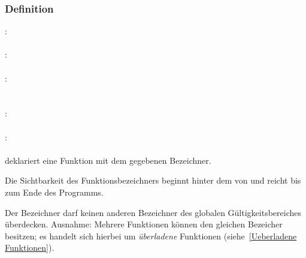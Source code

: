 \subsubsection{Definition}\label{Definition}
:\label{funktion_definition}\\
\hspace*{1cm} \Gspace\Gt{\{}\Gspace{} \Gspace\Gt{\}}\\
:\label{funktion_kopf}\\
\hspace*{1cm} \Gspace{}\Gspace\Gt{(}\Gspace{}\Gspace\Gt{)}\\
:\label{funktion_typ}\\
\hspace*{1cm} \\
\hspace*{1cm}\\
:\label{funktion_param_formal_liste}\\
\hspace*{1cm} \Gspace{}\\
:\label{funktion_param_formal}\\
\hspace*{1cm}\Gspace{}\Gspace{} \Gspace{}\Gspace{}\\

 deklariert eine Funktion mit dem gegebenen Bezeichner.

Die Sichtbarkeit des Funktionsbezeichners beginnt hinter dem \Gt{)} von 
und reicht bis zum Ende des Programms.

Der Bezeichner darf keinen anderen Bezeichner des globalen Gültigkeitsbereiches überdecken.
Ausnahme: Mehrere Funktionen können den gleichen Bezeicher besitzen; es handelt sich hierbei
um \emph{überladene} Funktionen (siehe~\ref{Ueberladene Funktionen}).

